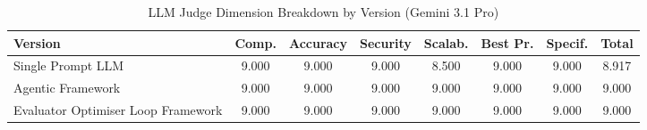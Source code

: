 \begin{table}[htbp]
\centering
\caption{LLM Judge Dimension Breakdown by Version (Gemini 3.1 Pro)}
\label{tab:judge_breakdown_version_gemini}
\begin{tabular}{lccccccc}
\toprule
Version & Comp. & Accuracy & Security & Scalab. & Best Pr. & Specif. & Total \\
\midrule
Single Prompt LLM & 9.000 & 9.000 & 9.000 & 8.500 & 9.000 & 9.000 & 8.917 \\
Agentic Framework & 9.000 & 9.000 & 9.000 & 9.000 & 9.000 & 9.000 & 9.000 \\
Evaluator Optimiser Loop Framework & 9.000 & 9.000 & 9.000 & 9.000 & 9.000 & 9.000 & 9.000 \\
\bottomrule
\end{tabular}
\end{table}